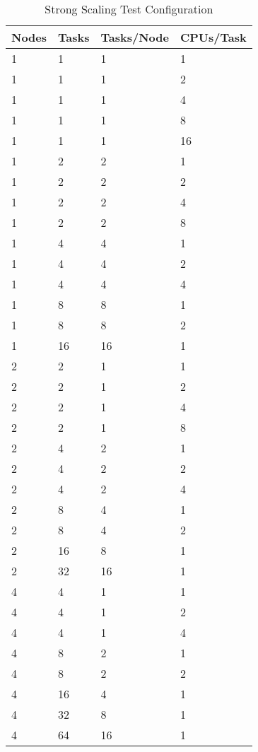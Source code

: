 \begin{appendices}
\begin{table}[H]
\centering
\begin{tabular}{|l|l|l|l|}
\hline
\multicolumn{1}{|c|}{\textbf{Nodes}} & \multicolumn{1}{c|}{\textbf{Tasks}} & \multicolumn{1}{c|}{\textbf{Tasks/Node}} & \multicolumn{1}{c|}{\textbf{CPUs/Task}} \\ \hline
1 & 1 & 1 & 1 \\ \hline
1 & 1 & 1 & 2 \\ \hline
1 & 1 & 1 & 4 \\ \hline
1 & 1 & 1 & 8 \\ \hline
1 & 1 & 1 & 16 \\ \hline
1 & 2 & 2 & 1 \\ \hline
1 & 2 & 2 & 2 \\ \hline
1 & 2 & 2 & 4 \\ \hline
1 & 2 & 2 & 8 \\ \hline
1 & 4 & 4 & 1 \\ \hline
1 & 4 & 4 & 2 \\ \hline
1 & 4 & 4 & 4 \\ \hline
1 & 8 & 8 & 1 \\ \hline
1 & 8 & 8 & 2 \\ \hline
1 & 16 & 16 & 1 \\ \hline
2 & 2 & 1 & 1 \\ \hline
2 & 2 & 1 & 2 \\ \hline
2 & 2 & 1 & 4 \\ \hline
2 & 2 & 1 & 8 \\ \hline
2 & 4 & 2 & 1 \\ \hline
2 & 4 & 2 & 2 \\ \hline
2 & 4 & 2 & 4 \\ \hline
2 & 8 & 4 & 1 \\ \hline
2 & 8 & 4 & 2 \\ \hline
2 & 16 & 8 & 1 \\ \hline
2 & 32 & 16 & 1 \\ \hline
4 & 4 & 1 & 1 \\ \hline
4 & 4 & 1 & 2 \\ \hline
4 & 4 & 1 & 4 \\ \hline
4 & 8 & 2 & 1 \\ \hline
4 & 8 & 2 & 2 \\ \hline
4 & 16 & 4 & 1 \\ \hline
4 & 32 & 8 & 1 \\ \hline
4 & 64 & 16 & 1 \\ \hline
\end{tabular}
\caption{Strong Scaling Test Configuration}
\label{tab:strong-config}
\end{table}


\end{appendices}
